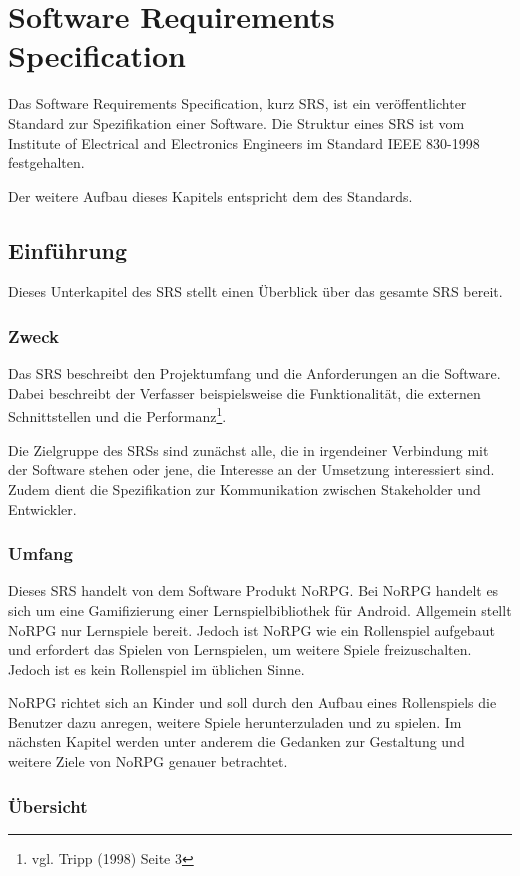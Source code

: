 \chapter{Software Requirements Specification}
	Das Software Requirements Specification, kurz SRS, ist ein veröffentlichter Standard zur Spezifikation einer Software. Die Struktur eines SRS ist vom Institute of Electrical and Electronics Engineers im Standard IEEE 830-1998 festgehalten.
	
	Der weitere Aufbau dieses Kapitels entspricht dem des Standards.
	
\section{Einführung}
	Dieses Unterkapitel des SRS stellt einen Überblick über das gesamte SRS bereit.
	
	\subsection{Zweck}
		Das SRS beschreibt den Projektumfang und die Anforderungen an die Software. Dabei beschreibt der Verfasser beispielsweise die Funktionalität, die externen Schnittstellen und die Performanz\footnote{vgl. Tripp \cite{srsIEEE}(1998) Seite 3}. 
	
		Die Zielgruppe des SRSs sind zunächst alle, die in irgendeiner Verbindung mit der Software stehen oder jene, die Interesse an der Umsetzung interessiert sind. Zudem dient die Spezifikation zur Kommunikation zwischen Stakeholder und Entwickler.
		
	\subsection{Umfang}
		Dieses SRS handelt von dem Software Produkt NoRPG. Bei NoRPG handelt es sich um eine Gamifizierung einer Lernspielbibliothek für Android. Allgemein stellt NoRPG nur Lernspiele bereit. Jedoch ist NoRPG wie ein Rollenspiel aufgebaut und erfordert das Spielen von Lernspielen, um weitere Spiele freizuschalten. Jedoch ist es kein Rollenspiel im üblichen Sinne.
		
		NoRPG richtet sich an Kinder und soll durch den Aufbau eines Rollenspiels die Benutzer dazu anregen, weitere Spiele herunterzuladen und zu spielen. Im nächsten Kapitel werden unter anderem die Gedanken zur Gestaltung und weitere Ziele von NoRPG genauer betrachtet.
		
	\subsection{Übersicht}
		
